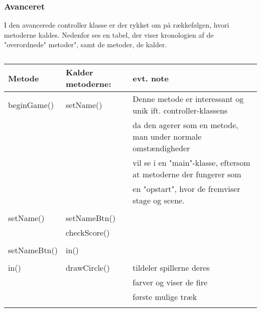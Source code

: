 \subsubsection{Avanceret}
I den avancerede controller klasse er der rykket om på rækkefølgen, hvori metoderne kaldes. Nedenfor ses en tabel, der viser kronologien af de "overordnede" metoder", samt de metoder, de kalder.
\begin{table}[H]
    \centering
    \caption{}\label{tbl:}
    \begin{tabular}{lll}
        \toprule
        Metode          & Kalder metoderne: & evt. note                                                         \\
        \midrule
        beginGame()     & setName()         & Denne metode er interessant og unik ift. controller-klassens      \\
                        &                   & da den agerer som en metode, man under normale omstændigheder     \\
                        &                   & vil se i en "main"-klasse, eftersom at metoderne der fungerer som \\
                        &                   & en "opstart", hvor de fremviser stage og scene.                   \\
                        &                                                                                       \\

        setName()       & setNameBtn()      &                                                                   \\
                        & checkScore()      &                                                                   \\
                        &                   &                                                                   \\

        setNameBtn()    & in()                                                                                  \\
                        &                                                                                       \\

        in()            & drawCircle()      & tildeler spillerne deres                                          \\
                        &                   & farver og viser de fire                                           \\
                        &                   & første mulige træk                                                \\
                        &                   &                                                                   \\


\end{tabular}
\end{table}

